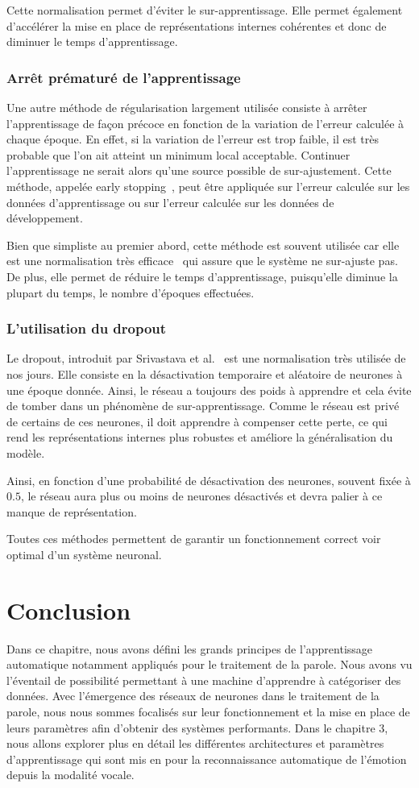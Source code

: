 Cette normalisation permet d'éviter le sur-apprentissage. Elle permet également d'accélérer la mise en place de représentations internes cohérentes et donc de diminuer le temps d'apprentissage.

\subsubsection{Arrêt prématuré de l'apprentissage}
Une autre méthode de régularisation largement utilisée consiste à arrêter l'apprentissage de façon précoce en fonction de la variation de l'erreur calculée à chaque époque. En effet, si la variation de l'erreur est trop faible, il est très probable que l'on ait atteint un minimum local acceptable. Continuer l'apprentissage ne serait alors qu'une source possible de sur-ajustement. Cette méthode, appelée early stopping~\cite{Prechelt1998}, peut être appliquée sur l'erreur calculée sur les données d'apprentissage ou sur l'erreur calculée sur les données de développement.

Bien que simpliste au premier abord, cette méthode est souvent utilisée car elle est une normalisation très efficace~\cite{Finnoff1993} qui assure que le système ne sur-ajuste pas. De plus, elle permet de réduire le temps d'apprentissage, puisqu'elle diminue la plupart du temps, le nombre d'époques effectuées.

\subsubsection{L'utilisation du dropout}
Le dropout, introduit par Srivastava et al.~\cite{Srivastava2014} est une normalisation très utilisée de nos jours. Elle consiste en la désactivation temporaire et aléatoire de neurones à une époque donnée. Ainsi, le réseau a toujours des poids à apprendre et cela évite de tomber dans un phénomène de sur-apprentissage. Comme le réseau est privé de certains de ces neurones, il doit apprendre à compenser cette perte, ce qui rend les représentations internes plus robustes et améliore la généralisation du modèle.

Ainsi, en fonction d'une probabilité de désactivation des neurones, souvent fixée à $0.5$, le réseau aura plus ou moins de neurones désactivés et devra palier à ce manque de représentation.

Toutes ces méthodes permettent de garantir un fonctionnement correct voir optimal d'un système neuronal.

\section{Conclusion}
Dans ce chapitre, nous avons défini les grands principes de l'apprentissage automatique notamment appliqués pour le traitement de la parole. Nous avons vu l'éventail de possibilité permettant à une machine d'apprendre à catégoriser des données. Avec l'émergence des réseaux de neurones dans le traitement de la parole, nous nous sommes focalisés sur leur fonctionnement et la mise en place de leurs paramètres afin d'obtenir des systèmes performants. Dans le chapitre 3, nous allons explorer plus en détail les différentes architectures et paramètres d'apprentissage qui sont mis en pour la reconnaissance automatique de l'émotion depuis la modalité vocale.
